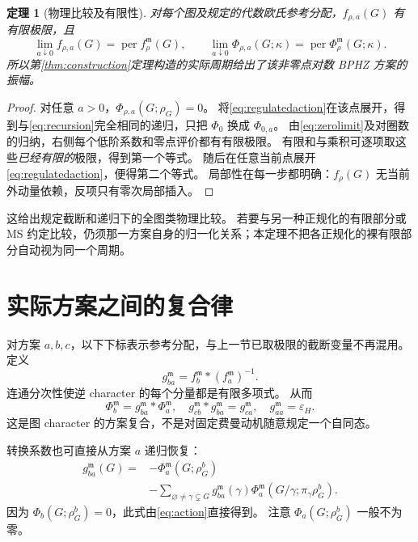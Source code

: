\documentclass[11pt,a4paper]{ctexart}
\theoremstyle{cnplain}
\newtheorem{theorem}{定理}[section]
\theoremstyle{remark}\newtheorem{remark}[theorem]{注}
\newcommand{\per}{\operatorname{per}}
\newcommand{\eps}{\varepsilon_H}
\begin{document}
\begin{theorem}[物理比较及有限性]\label{thm:physical}
对每个图及规定的代数欧氏参考分配，$f_{\rho,a}(G)$ 有有限极限，且
\begin{equation}\label{eq:physical}
 \lim_{a\downarrow0} f_{\rho,a}(G)=\per f_\rho^{\mathfrak m}(G),
 \qquad
 \lim_{a\downarrow0}\Phi_{\rho,a}(G;\kappa)
                         =\per\Phi_\rho^{\mathfrak m}(G;\kappa).
\end{equation}
所以第\ref{thm:construction}定理构造的实际周期给出了该非零点对数 BPHZ 方案的振幅。
\end{theorem}
\begin{proof}
对任意 $a>0$，$\Phi_{\rho,a}(G;\rho_G)=0$。
将\eqref{eq:regulatedaction}在该点展开，得到与\eqref{eq:recursion}完全相同的递归，只把 $\Phi_0$ 换成 $\Phi_{0,a}$。
由\eqref{eq:zerolimit}及对圈数的归纳，右侧每个低阶系数和零点评价都有有限极限。
有限和与乘积可逐项取这些\emph{已经有限的}极限，得到第一个等式。
随后在任意当前点展开\eqref{eq:regulatedaction}，便得第二个等式。
局部性在每一步都明确：$f_\rho(G)$ 无当前外动量依赖，反项只有零次局部插入。
\end{proof}

这给出规定截断和递归下的全图类物理比较。
若要与另一种正规化的有限部分或 MS 约定比较，仍须那一方案自身的归一化关系；本定理不把各正规化的裸有限部分自动视为同一个周期。

\section{实际方案之间的复合律}
对方案 $a,b,c$，以下下标表示参考分配，与上一节已取极限的截断变量不再混用。
定义
\begin{equation}\label{eq:transition}
 g_{ba}^{\mathfrak m}=f_b^{\mathfrak m}*(f_a^{\mathfrak m})^{-1}.
\end{equation}
连通分次性使逆 character 的每个分量都是有限多项式。
从而
\begin{equation}\label{eq:cocycle}
 \Phi_b^{\mathfrak m}=g_{ba}^{\mathfrak m}*\Phi_a^{\mathfrak m},
 \quad g_{cb}^{\mathfrak m}*g_{ba}^{\mathfrak m}=g_{ca}^{\mathfrak m},
 \quad g_{aa}^{\mathfrak m}=\eps.
\end{equation}
这是图 character 的方案复合，不是对固定费曼动机随意规定一个自同态。

转换系数也可直接从方案 $a$ 递归恢复：
\begin{align}\label{eq:directtransition}
 g_{ba}^{\mathfrak m}(G)={}&-\Phi_a^{\mathfrak m}(G;\rho_G^b)\nonumber\\
 &-\sum_{\varnothing\ne\gamma\subsetneq G}
 g_{ba}^{\mathfrak m}(\gamma)
 \Phi_a^{\mathfrak m}(G/\gamma;\pi_\gamma\rho_G^b).
\end{align}
因为 $\Phi_b(G;\rho_G^b)=0$，此式由\eqref{eq:action}直接得到。
注意 $\Phi_a(G;\rho_G^b)$ 一般不为零。
\end{document}
